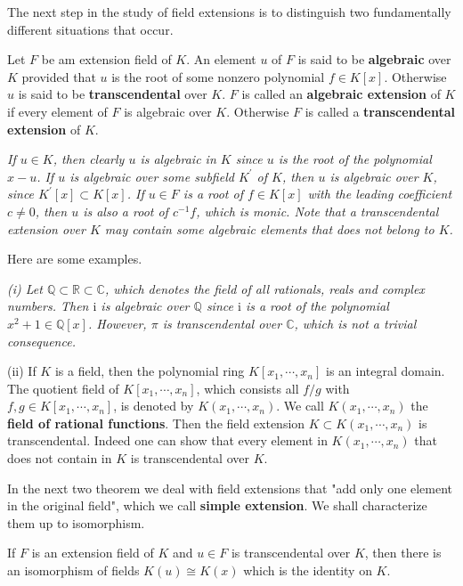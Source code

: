 The next step in the study of field extensions is to distinguish two fundamentally different situations that occur.
\begin{definition}
Let $F$ be am extension field of $K$. An element $u$ of $F$ is said to be \textbf{algebraic} over $K$ provided that $u$ is the root of some nonzero polynomial $f\in K[x]$. Otherwise $u$ is said to be \textbf{transcendental} over $K$. $F$ is called an \textbf{algebraic extension} of $K$ if every element of $F$ is algebraic over $K$. Otherwise $F$ is called a \textbf{transcendental extension} of $K$.
\end{definition}
\begin{note}\em
If $u\in K$, then clearly $u$ is algebraic in $K$ since $u$ is the root of the polynomial $x-u$. If $u$ is algebraic over some subfield $K^\prime$ of $K$, then $u$ is algebraic over $K$, since $K^\prime[x]\subset K[x]$. If $u\in F$ is a root of $f\in K[x]$ with the leading coefficient $c\ne 0$, then $u$ is also a root of $c^{-1}f$, which is monic. Note that a transcendental extension over $K$ may contain some algebraic elements that does not belong to $K$.
\end{note}
Here are some examples.
\begin{example}\em
(i) Let $\mathbb{Q}\subset\mathbb{R}\subset\mathbb{C}$, which denotes the field of all rationals, reals and complex numbers. Then $\mathrm{i}$ is algebraic over $\mathbb{Q}$ since $\mathrm{i}$ is a root of the polynomial $x^2+1\in\mathbb{Q}[x]$. However, $\pi$ is transcendental over $\mathbb{C}$, which is not a trivial consequence.\par
(ii) If $K$ is a field, then the polynomial ring $K[x_1,\cdots,x_n]$ is an integral domain. The quotient field of $K[x_1,\cdots,x_n]$, which consists all $f/g$ with $f,g\in K[x_1,\cdots,x_n]$, is denoted by $K(x_1,\cdots,x_n)$. We call $K(x_1,\cdots,x_n)$ the \textbf{field of rational functions}. Then the field extension $K\subset K(x_1,\cdots,x_n)$ is transcendental. Indeed one can show that every element in $K(x_1,\cdots,x_n)$ that does not contain in $K$ is transcendental over $K$.
\end{example}
In the next two theorem we deal with field extensions that "add only one element in the original field", which we call \textbf{simple extension}. We shall characterize them up to isomorphism.
\begin{theorem}
If $F$ is an extension field of $K$ and $u\in F$ is transcendental over $K$, then there is an isomorphism of fields $K(u)\cong K(x)$ which is the identity on $K$.
\end{theorem}
